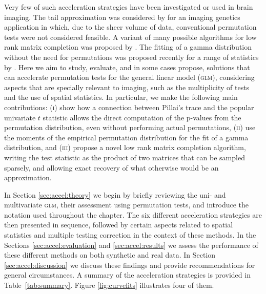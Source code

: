 Very few of such acceleration strategies have been investigated or used in brain imaging. The tail approximation was considered by \citet{Ge2012} for an imaging genetics application in which, due to the sheer volume of data, conventional permutation tests were not considered feasible. A variant of many possible algorithms for low rank matrix completion was proposed by \citet{Hinrichs2013}. The fitting of a gamma distribution without the need for permutations was proposed recently for a range of statistics by \citet{Minas2014}. Here we aim to study, evaluate, and in some cases propose, solutions that can accelerate permutation tests for the general linear model (\textsc{glm}), considering aspects that are specially relevant to imaging, such as the multiplicity of tests and the use of spatial statistics. In particular, we make the following main contributions: (\textsc{i}) show how a connection between Pillai's trace and the popular univariate $t$ statistic allows the direct computation of the p-values from the permutation distribution, even without performing actual permutations, (\textsc{ii}) use the moments of the empirical permutation distribution for the fit of a gamma distribution, and (\textsc{iii}) propose a novel low rank matrix completion algorithm, writing the test statistic as the product of two matrices that can be sampled sparsely, and allowing exact recovery of what otherwise would be an approximation.

In Section \ref{sec:accel:theory} we begin by briefly reviewing the uni- and multivariate \textsc{glm}, their assessment using permutation tests, and introduce the notation used throughout the chapter. The six different acceleration strategies are then presented in sequence, followed by certain aspects related to spatial statistics and multiple testing correction in the context of these methods. In the Sections \ref{sec:accel:evaluation} and \ref{sec:accel:results} we assess the performance of these different methods on both synthetic and real data. In Section \ref{sec:accel:discussion} we discuss these findings and provide recommendations for general circumstances. A summary of the acceleration strategies is provided in Table~\ref{tab:summary}. Figure \ref{fig:curvefits} illustrates four of them.

